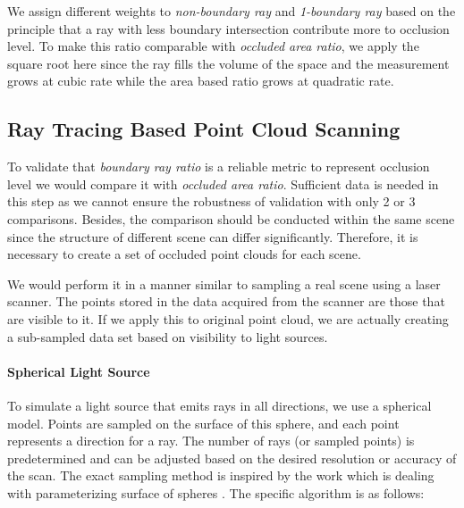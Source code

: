 \documentclass[11pt, a4paper,oneside,chapterprefix=false]{scrbook}
\begin{document}
We assign different weights to \emph{non-boundary ray} and \emph{1-boundary ray} based on the principle that a ray with less boundary intersection contribute more to occlusion level. To make this ratio comparable with \emph{occluded area ratio}, we apply the square root here since the ray fills the volume of the space and the measurement grows at cubic rate while the area based ratio grows at quadratic rate. 

\subsection{Ray Tracing Based Point Cloud Scanning} \label{sec:ray tracing point cloud scanning}

To validate that \emph{boundary ray ratio} is a reliable metric to represent occlusion level we would compare it with \emph{occluded area ratio}. Sufficient data is needed in this step as we cannot ensure the robustness of validation with only 2 or 3 comparisons. Besides, the comparison should be conducted within the same scene since the structure of different scene can differ significantly. Therefore, it is necessary to create a set of occluded point clouds for each scene.

\vspace{10pt}

We would perform it in a manner similar to sampling a real scene using a laser scanner. The points stored in the data acquired from the scanner are those that are visible to it. If we apply this to original point cloud, we are actually creating a sub-sampled data set based on visibility to light sources. 

\paragraph{Spherical Light Source}

To simulate a light source that emits rays in all directions, we use a spherical model. Points are sampled on the surface of this sphere, and each point represents a direction for a ray. The number of rays (or sampled points) is predetermined and can be adjusted based on the desired resolution or accuracy of the scan. The exact sampling method is inspired by the work which is dealing with parameterizing surface of spheres \cite{FH:05}. The specific algorithm is as follows:
\end{document}
